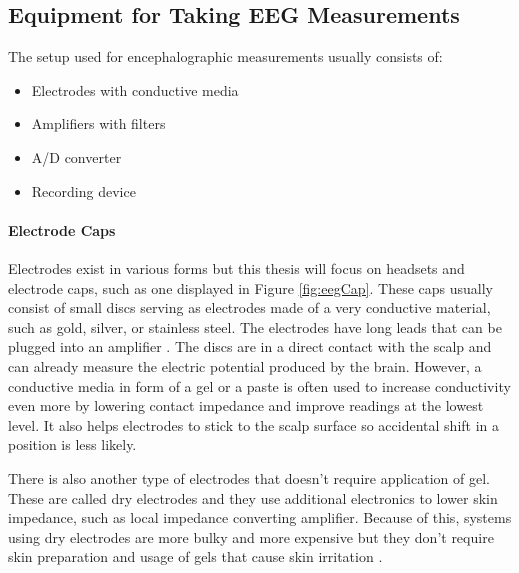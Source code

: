 \subsection{Equipment for Taking EEG Measurements}
The setup used for encephalographic measurements usually consists of: 
\begin{itemize}
  \item Electrodes with conductive media
  \item Amplifiers with filters
  \item A/D converter
  \item Recording device
\end{itemize}

\paragraph{Electrode Caps}
Electrodes exist in various forms but this thesis will focus on
headsets and electrode caps, such as one displayed in Figure \ref{fig:eegCap}.
These caps usually consist of small discs serving as electrodes made
of a very conductive material, such as gold, silver, or stainless steel. The electrodes have long leads that can be plugged into an
amplifier \cite{eegFund}. The discs are in a direct contact with the scalp and can already
measure the electric potential produced by the brain. However, a conductive media in form of a
gel or a paste is often used to increase conductivity even more by lowering
contact impedance and improve readings at the lowest level. It also helps
electrodes to stick to the scalp surface so accidental shift in a position is less likely. 

There is also another type of electrodes that doesn't require application of gel. These are called dry electrodes and they use additional electronics to lower skin impedance, such as local impedance converting amplifier. Because of this, systems using dry electrodes are more bulky and more expensive but they don't require skin preparation and usage of gels that cause skin irritation \cite{dryElectrodes}. 

